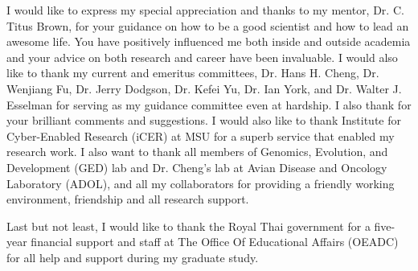 I would like to express my special appreciation and thanks
to my mentor, Dr. C. Titus Brown, for your guidance on how
to be a good scientist and how to lead an awesome life. You
have positively influenced me both inside and outside
academia and your advice on both research and career have
been invaluable. I would also like to thank my current and
emeritus committees, Dr.  Hans H.  Cheng, Dr.  Wenjiang Fu,
Dr.  Jerry Dodgson, Dr.  Kefei Yu, Dr.  Ian York, and Dr.
Walter J. Esselman for serving as my guidance committee even
at hardship. I also thank for your brilliant comments and
suggestions. I would also like to thank Institute for
Cyber-Enabled Research (iCER) at MSU for a superb service
that enabled my research work. I also want to thank all
members of Genomics, Evolution, and Development (GED) lab
and Dr. Cheng's lab at Avian Disease and Oncology Laboratory
(ADOL), and all my collaborators for providing a friendly
working environment, friendship and all research support.

Last but not least, I would like to thank the Royal Thai
government for a five-year financial support and staff at
The Office Of Educational Affairs (OEADC) for all help and
support during my graduate study.
